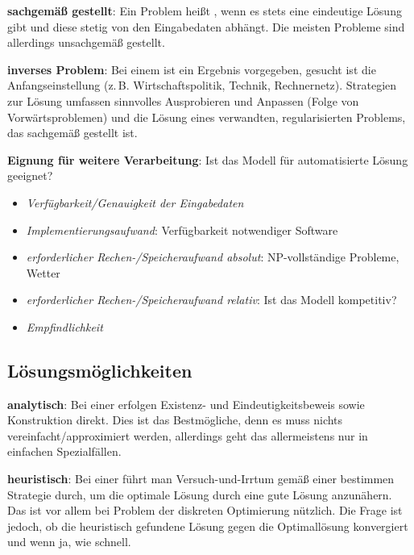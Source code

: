 \linie

\textbf{sachgemäß gestellt}:
Ein Problem heißt , wenn es stets eine eindeutige Lösung gibt und
diese stetig von den Eingabedaten abhängt.
Die meisten Probleme sind allerdings unsachgemäß gestellt.

\textbf{inverses Problem}:
Bei einem  ist ein Ergebnis vorgegeben, gesucht ist die
Anfangseinstellung
(z.\,B. Wirtschaftspolitik, Technik, Rechnernetz).
Strategien zur Lösung umfassen sinnvolles Ausprobieren und Anpassen (Folge von Vorwärtsproblemen)
und die Lösung eines verwandten, regularisierten Problems, das sachgemäß gestellt ist.

\linie

\textbf{Eignung für weitere Verarbeitung}:
Ist das Modell für automatisierte Lösung geeignet?
\begin{itemize}
    \item
    \emph{Verfügbarkeit/Genauigkeit der Eingabedaten}
    
    \item
    \emph{Implementierungsaufwand}:
    Verfügbarkeit notwendiger Software
    
    \item
    \emph{erforderlicher Rechen-/Speicheraufwand absolut}:
    NP-vollständige Probleme, Wetter
    
    \item
    \emph{erforderlicher Rechen-/Speicheraufwand relativ}:
    Ist das Modell kompetitiv?
    
    \item
    \emph{Empfindlichkeit}
\end{itemize}

\subsection{%
    Lösungsmöglichkeiten%
}

\textbf{analytisch}:
Bei einer  erfolgen
Existenz- und Eindeutigkeitsbeweis sowie Konstruktion direkt.
Dies ist das Bestmögliche, denn es muss nichts vereinfacht/approximiert werden,
allerdings geht das allermeistens nur in einfachen Spezialfällen.

\textbf{heuristisch}:
Bei einer  führt man Versuch-und-Irrtum gemäß einer bestimmen
Strategie durch, um die optimale Lösung durch eine gute Lösung anzunähern.
Das ist vor allem bei Problem der diskreten Optimierung nützlich.
Die Frage ist jedoch, ob die heuristisch gefundene Lösung gegen die Optimallösung konvergiert
und wenn ja, wie schnell.

